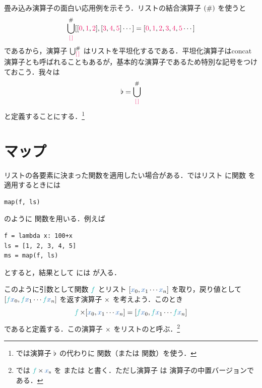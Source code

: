 \documentclass[a5paper,twoside,fleqn,draft]{jsbook}
\begin{document}
\separator

畳み込み演算子の面白い応用例を示そう．リストの結合演算子 $(\operatorname{\#})$ を使うと
\begin{equation}
  \mFold_\mEmptyList^{\hAppend}[[\hConstant{0},\hConstant{1},\hConstant{2}],[\hConstant{3},\hConstant{4},\hConstant{5}]\dotsb]
  =[\hConstant{0},\hConstant{1},\hConstant{2},\hConstant{3},\hConstant{4},\hConstant{5}\dotsb]
\end{equation}
であるから，演算子 $\mFold_\mEmptyList^{\hAppend}$ はリストを平坦化するである．平坦化演算子はconcat演算子とも呼ばれることもあるが，基本的な演算子であるため特別な記号をつけておこう．我々は
\begin{equation}
  \mJoinList
  =\mFold_\mEmptyList^{\hAppend}
\end{equation}
と定義することにする．\footnote{\haskell では演算子 $\operatorname{\flat}$ の代わりに  関数（または  関数）を使う．}

\section{マップ}

リストの各要素に決まった関数を適用したい場合がある．\python ではリスト  に関数  を適用するときには
\begin{pythoncode}
\begin{verbatim}
map(f, ls)
\end{verbatim}
\end{pythoncode}
のように  関数を用いる．例えば
\begin{pythoncode}
\begin{verbatim}
f = lambda x: 100+x
ls = [1, 2, 3, 4, 5]
ms = map(f, ls)
\end{verbatim}
\end{pythoncode}
とすると，結果として  には \code{[101, 102, 103, 104, 105]} が入る．

このように引数として関数 $\hFunc{f}$ とリスト $[\hVar{x}_0,\hVar{x}_1\dotsb \hVar{x}_n]$ を取り，戻り値として $[\hFunc{f}\hVar{x}_0,\hFunc{f}\hVar{x}_1\dotsb \hFunc{f}\hVar{x}_n]$ を返す演算子 $\operatorname{\times}$ を考えよう．このとき
\begin{equation}
  \hFunc{f}\hMap[\hVar{x}_0,\hVar{x}_1\dotsb \hVar{x}_n]
  =[\hFunc{f}\hVar{x}_0,\hFunc{f}\hVar{x}_1\dotsb \hFunc{f}\hVar{x}_n]
\end{equation}
であると定義する．この演算子 $\operatorname{\times}$ をリストのと呼ぶ．\footnote{\haskell では $\hFunc{f}\hMap\hListVar{x}$ を または  と書く．ただし演算子 \code{<\$>} は  演算子の中置バージョンである．}
\end{document}
